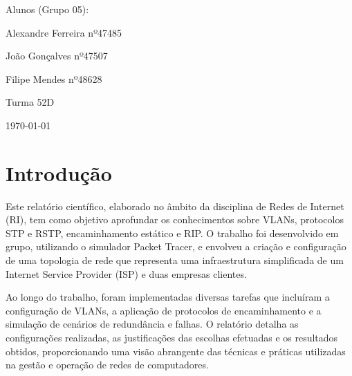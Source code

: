 \documentclass[11pt,english, openright, oneside]{book}
\begin{document}
\begin{titlepage}
\begin{center}
{        \vspace{0.5cm}
              
        Alunos (Grupo 05):
        \par
        Alexandre Ferreira nº47485 
        \par 
        João Gonçalves nº47507
        \par
        Filipe Mendes nº48628
        
        \vspace{0.5cm} 
        Turma 52D
                
        \vspace{1cm}
        {\normalsize \today \par}
	             
	             
	             
	             \par}
	\end{center}
		
	
	
	\pagebreak

\end{titlepage}

\tableofcontents
\pagebreak
\newpage


\begingroup
\let\clearpage\relax
\pagebreak
\listoffigures
\endgroup

\newpage

\begingroup
\let\clearpage\relax
\pagebreak
\listoftables
\endgroup

\newpage

\mainmatter
\chapter{Introdução}
Este relatório científico, elaborado no âmbito da disciplina de Redes de
Internet (RI), tem como objetivo aprofundar os conhecimentos sobre VLANs,
protocolos STP e RSTP, encaminhamento estático e RIP. O trabalho foi
desenvolvido em grupo, utilizando o simulador Packet Tracer, e envolveu a
criação e configuração de uma topologia de rede que representa uma
infraestrutura simplificada de um Internet Service Provider (ISP) e duas
empresas clientes.

\vspace{0.4cm}

Ao longo do trabalho, foram implementadas diversas tarefas que incluíram a
configuração de VLANs, a aplicação de protocolos de encaminhamento e a simulação
de cenários de redundância e falhas. O relatório detalha as configurações
realizadas, as justificações das escolhas efetuadas e os resultados obtidos,
proporcionando uma visão abrangente das técnicas e práticas utilizadas na gestão
e operação de redes de computadores.
\end{document}
